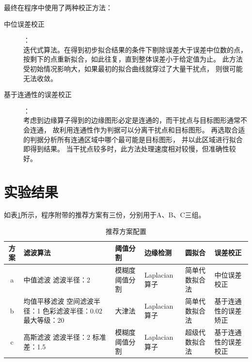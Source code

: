 \documentclass[12pt,a4paper]{article}
\begin{document}
最终在程序中使用了两种校正方法：
\begin{description}
    \item[中位误差校正] ：\\
        迭代式算法。在得到初步拟合结果的条件下剔除误差大于误差中位数的点，
        按剩下的点重新拟合，如此往复，直到整体误差小于给定值为止。
        此方法受初始情况影响大，如果最初的拟合曲线就穿过了大量干扰点，
        则很可能无法收敛。
    \item[基于连通性的误差校正] ：\\
        考虑到边缘算子得到的边缘图形必定是连通的，而干扰点与目标图形通常不会连通，
        故利用连通性作为判据可以分离干扰点和目标图形。
        再选取合适的判据分析所有连通区域中哪个最可能是目标图形，
        并以此区域进行拟合即得到结果。
        当干扰点较多时，此方法处理速度相对较慢，但准确性较好。
\end{description}

\section{实验结果}

如表\ref{tab:config}所示，程序附带的推荐方案有三份，分别用于A、B、C三组。

\begin{table}[!htb]
    \centering
    \caption{推荐方案配置}\label{tab:config}
    \begin{tabularx}{\textwidth}{|c|X|X|X|X|X|}
        \hline
        方案 & 滤波算法 & 阈值分割 & 边缘检测 & 圆拟合 & 误差校正 \\
        \hline
        a & 中值滤波 \newline 滤波半径：2 & 模糊度阈值分割 & Laplacian算子 & 简单代数拟合法 & 中位误差校正 \\
        \hline
        b & 均值平移滤波 \newline 空间滤波半径：1 \newline 色彩滤波半径：0.02 \newline 最大等级：20 & 大津法 & Laplacian算子 & 简单代数拟合法 & 基于连通性的误差矫正 \\
        \hline
        c & 高斯滤波 \newline 滤波半径：2 \newline 标准差：1.5 & 模糊度阈值分割 & Laplacian算子 & 超级代数拟合法 & 基于连通性的误差校正 \\
        \hline
    \end{tabularx}
\end{table}
\end{document}
